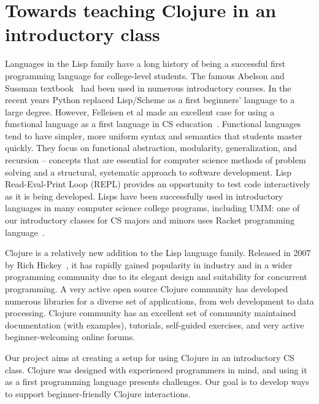 \documentclass[submission,copyright,creativecommons]{eptcs}
\newcommand{\allcomments}[1]{{#1}}
\newcommand{\emcomment}[1]{{\bf \textcolor{ForestGreen}{\allcomments{{#1}}}}}
\begin{document}
\section{Towards teaching Clojure in an introductory class}\label{sec:project}
Languages in the Lisp family have a long history of being a successful first programming language for college-level students.
The famous Abelson and Sussman textbook~\cite{Abelson} had been used in numerous introductory courses.
In the recent years Python replaced Lisp/Scheme as a first beginners' language to a large degree. However, 
Felleisen et al made an excellent case for using a functional language as a first language in  CS education~\cite{Felleisen:2004}.   
Functional languages tend to have simpler, more uniform syntax and semantics that students master quickly.
They focus on functional abstraction, modularity, generalization, and recursion -- concepts that are essential for computer science methods of 
problem solving and a structural, systematic approach to software development. 
Lisp Read-Eval-Print Loop (REPL) provides an opportunity to test code interactively as it is being developed. 
Lisps have been successfully used in introductory languages in many computer science college programs, including UMM: 
one of our introductory classes for CS majors and minors uses Racket programming language~\cite{htdp,htdp2}. 

Clojure is a relatively new addition to the Lisp language family. Released in 2007 by Rich Hickey~\cite{Hickey:2008}, it has rapidly gained popularity in industry
and in a wider programming community 
due to its elegant design and suitability for concurrent programming. A very active open source Clojure community has developed numerous 
libraries for a diverse set of applications, from web development to data processing. 
Clojure community has an excellent set of community maintained documentation (with examples), tutorials, 
self-guided exercises, and very active beginner-welcoming online forums.

Our project aims at creating a setup for using Clojure in an introductory CS class. Clojure was designed with experienced programmers in mind, 
and using it as a first programming language presents challenges. Our goal is to develop ways to support beginner-friendly Clojure interactions. 
\end{document}
